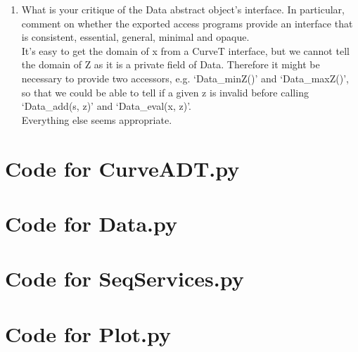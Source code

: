 \documentclass[12pt]{article}
\begin{document}
\begin{enumerate}
\item What is your critique of the Data abstract object's interface.  In
  particular, comment on whether the exported access programs provide an
  interface that is consistent, essential, general, minimal and opaque.\\
  
  It’s easy to get the domain of x from a CurveT interface, but we cannot tell the domain of Z as it is a private field of Data. Therefore it might be necessary to provide two accessors, e.g. ‘Data\_minZ()’ and ‘Data\_maxZ()’, so that we could be able to tell if a given z is invalid before calling ‘Data\_add(s, z)’ and ‘Data\_eval(x, z)’.\\
Everything else seems appropriate.\\


\end{enumerate}

\newpage

\lstset{language=Python, basicstyle=\tiny, breaklines=true, showspaces=false,
  showstringspaces=false, breakatwhitespace=true}

\def\thesection{\Alph{section}}

\section{Code for CurveADT.py}

\noindent 

\newpage

\section{Code for Data.py}

\noindent 

\newpage

\section{Code for SeqServices.py}

\noindent 

\newpage

\section{Code for Plot.py}

\noindent 
\end{document}
